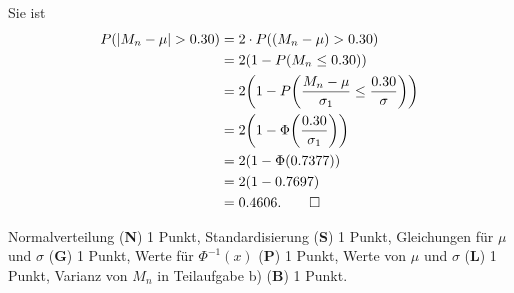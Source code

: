\begin{loesung}
\begin{teilaufgaben}
Sie ist
\begin{align*}
P(|M_n-\mu|>0.30)
&=
2 \cdot P((M_n-\mu) >0.30)
\\
&=
2(1-P(M_n\le 0.30))
\\
&=
2\biggl(1-P\biggl(\frac{M_n-\mu}{\sigma_1}\le \frac{0.30}{\sigma}\biggr)\biggr)
\\
&=
2\biggl(1-\Phi\biggl(\frac{0.30}{\sigma_1}\biggr)\biggr)
\\
&=
2(1-\Phi(0.7377))
\\
&=
2(1-0.7697)
\\
&=
0.4606.
\qedhere
\end{align*}
\end{teilaufgaben}
\end{loesung}

\begin{bewertung}
Normalverteilung ({\bf N}) 1 Punkt,
Standardisierung ({\bf S}) 1 Punkt,
Gleichungen für $\mu$ und $\sigma$ ({\bf G}) 1 Punkt,
Werte für $\Phi^{-1}(x)$ ({\bf P}) 1 Punkt,
Werte von $\mu$ und $\sigma$ ({\bf L}) 1 Punkt,
Varianz von $M_n$ in Teilaufgabe b) ({\bf B}) 1 Punkt.
\end{bewertung}
